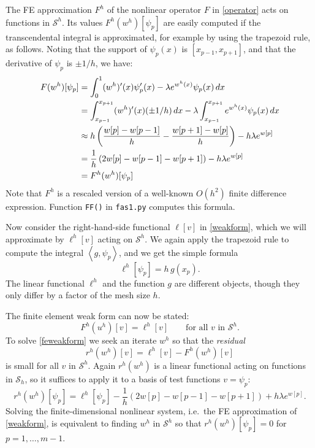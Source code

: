 \documentclass[letterpaper,final,12pt,reqno]{amsart}
\newcommand{\ip}[2]{\left<#1,#2\right>}
\begin{document}
The FE approximation $F^h$ of the nonlinear operator $F$ in \eqref{operator} acts on functions in $\mathcal{S}^h$.  Its values $F^h(w^h)[\psi_p]$ are easily computed if the transcendental integral is approximated, for example by using the trapezoid rule, as follows.  Noting that the support of $\psi_p(x)$ is $[x_{p-1},x_{p+1}]$, and that the derivative of $\psi_p$ is $\pm 1/h$, we have:
\begin{align}
  F(w^h)[\psi_p] &= \int_0^1 (w^h)'(x) \psi_p'(x) - \lambda e^{w^h(x)} \psi_p(x)\, dx  \label{feoperator} \\
    &= \int_{x_{p-1}}^{x_{p+1}} (w^h)'(x) (\pm 1/h)\,dx - \lambda \int_{x_{p-1}}^{x_{p+1}} e^{w^h(x)} \psi_p(x)\, dx \notag \\
    &\approx h \left(\frac{w[p]-w[p-1]}{h} - \frac{w[p+1]-w[p]}{h}\right) - h \lambda e^{w[p]}  \notag \\
    &= \frac{1}{h}\left(2w[p]-w[p-1]-w[p+1]\right) - h \lambda e^{w[p]} \notag \\
    &= F^h(w^h)[\psi_p] \notag
\end{align}
Note that $F^h$ is a rescaled version of a well-known $O(h^2)$ finite difference expression.  Function \texttt{FF()} in \texttt{fas1.py} computes this formula.

Now consider the right-hand-side functional $\ell[v]$ in \eqref{weakform}, which we will approximate by $\ell^h[v]$ acting on $\mathcal{S}^h$.  We again apply the trapezoid rule to compute the integral $\ip{g}{\psi_p}$, and we get the simple formula
\begin{equation}
  \ell^h[\psi_p] = h\, g(x_p). \label{ferhs}
\end{equation}
The linear functional $\ell^h$ and the function $g$ are different objects, though they only differ by a factor of the mesh size $h$.

The finite element weak form can now be stated:
\begin{equation}
  F^h(u^h)[v] = \ell^h[v] \qquad \text{for all } v \text{ in } \mathcal{S}^h. \label{feweakform}
\end{equation}
To solve \eqref{feweakform} we seek an iterate $w^h$ so that the \emph{residual}
\begin{equation}
  r^h(w^h)[v] = \ell^h[v] - F^h(w^h)[v]  \label{feresidual}
\end{equation}
is small for all $v$ in $\mathcal{S}^h$.  Again $r^h(w^h)$ is a linear functional acting on functions in $\mathcal{S}_h$, so it suffices to apply it to a basis of test functions $v=\psi_p$:
\begin{equation}
  r^h(w^h)[\psi_p] = \ell^h[\psi_p] - \frac{1}{h}\left(2w[p]-w[p-1]-w[p+1]\right) + h \lambda e^{w[p]}.  \label{feresidualdetail}
\end{equation}
Solving the finite-dimensional nonlinear system, i.e.~the FE approximation of \eqref{weakform}, is equivalent to finding $w^h$ in $\mathcal{S}^h$ so that $r^h(w^h)[\psi_p]=0$ for $p=1,\dots,m-1$.
\end{document}
